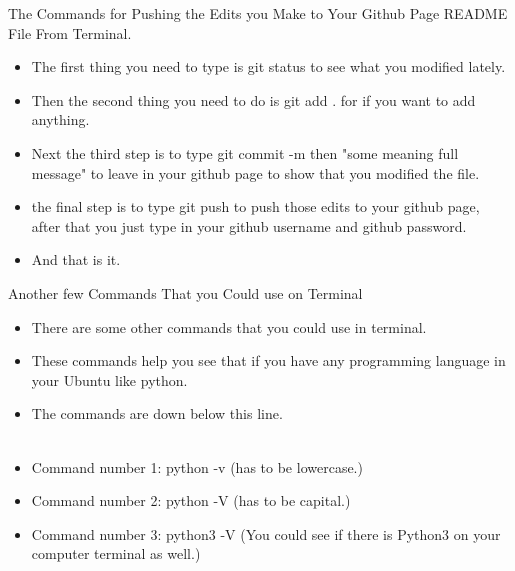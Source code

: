 \documentclass[aspectratio=43]{beamer}
\begin{document}
\begin{frame}{The Commands for Pushing the Edits you Make to Your Github Page README File From Terminal.}
\begin{itemize}
\item The first thing you need to type is git status to see what you modified lately.
\item Then the second thing you need to do is git add . for if you want to add anything.
\item Next the third step is to type git commit -m then "some meaning full message" to leave in your github page to show that you modified the file.
\item the final step is to type git push to push those edits to your github page, after that you just type in your github username and github password.
\item And that is it.
\end{itemize}
\end{frame}



\begin{frame}{Another few Commands That you Could use on Terminal}
\begin{itemize}

\item There are some other commands that you could use in terminal.
\item These commands help you see that if you have any programming language in your Ubuntu like python.
\item The commands are down below this line.
\\
~\\ 
\item Command number 1: python -v (has to be lowercase.)
\item Command number 2: python -V (has to be capital.)
\item Command number 3: python3 -V (You could see if there is Python3 on your computer terminal as well.)
\end{itemize}
\end{frame}
\end{document}
